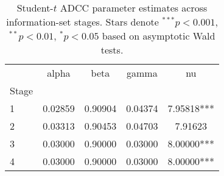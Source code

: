 \begin{table}
\caption{Student-$t$ ADCC parameter estimates across information-set stages.  Stars denote $^{***}p<0.001$, $^{**}p<0.01$, $^{*}p<0.05$ based on asymptotic Wald tests.}
\label{tab:adcc_coeffs}
\begin{tabular}{lcccc}
\toprule
 & alpha & beta & gamma & nu \\
Stage &  &  &  &  \\
\midrule
1 & 0.02859 & 0.90904 & 0.04374 & 7.95818*** \\
2 & 0.03313 & 0.90453 & 0.04703 & 7.91623 \\
3 & 0.03000 & 0.90000 & 0.03000 & 8.00000*** \\
4 & 0.03000 & 0.90000 & 0.03000 & 8.00000*** \\
\bottomrule
\end{tabular}
\end{table}
